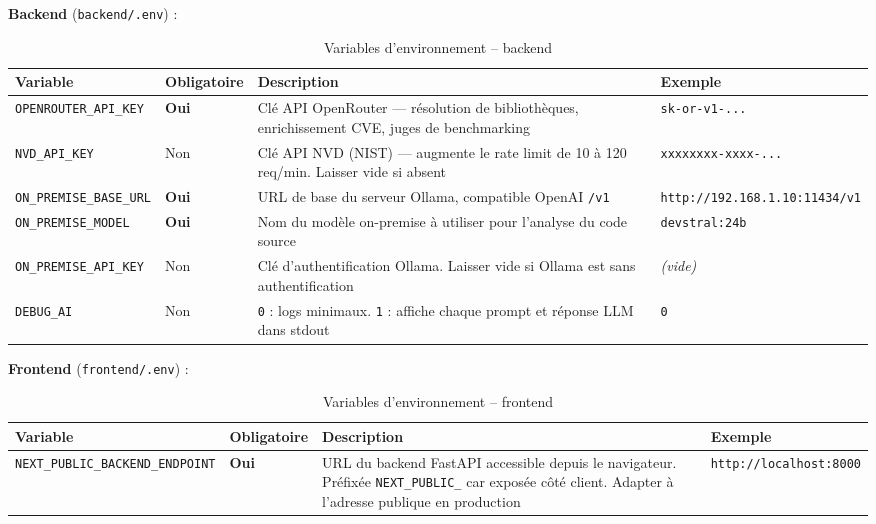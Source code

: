 \documentclass[a4paper, 12pt, hidelinks]{article}
\begin{document}
\textbf{Backend} (\texttt{backend/.env}) :

\begin{table}[H]
  \centering
  \begin{tabularx}{\textwidth}{l l X l}
    \toprule
    \textbf{Variable} & \textbf{Obligatoire} & \textbf{Description} & \textbf{Exemple} \\
    \midrule
    \texttt{OPENROUTER\_API\_KEY} & \textbf{Oui} & Clé API OpenRouter — résolution de bibliothèques, enrichissement CVE, juges de benchmarking & \texttt{sk-or-v1-...} \\
    \addlinespace
    \texttt{NVD\_API\_KEY} & Non & Clé API NVD (NIST) — augmente le rate limit de 10 à 120 req/min. Laisser vide si absent & \texttt{xxxxxxxx-xxxx-...} \\
    \addlinespace
    \texttt{ON\_PREMISE\_BASE\_URL} & \textbf{Oui} & URL de base du serveur Ollama, compatible OpenAI \texttt{/v1} & \texttt{http://192.168.1.10:11434/v1} \\
    \addlinespace
    \texttt{ON\_PREMISE\_MODEL} & \textbf{Oui} & Nom du modèle on-premise à utiliser pour l'analyse du code source & \texttt{devstral:24b} \\
    \addlinespace
    \texttt{ON\_PREMISE\_API\_KEY} & Non & Clé d'authentification Ollama. Laisser vide si Ollama est sans authentification & \textit{(vide)} \\
    \addlinespace
    \texttt{DEBUG\_AI} & Non & \texttt{0} : logs minimaux. \texttt{1} : affiche chaque prompt et réponse LLM dans stdout & \texttt{0} \\
    \bottomrule
  \end{tabularx}
  \caption{Variables d'environnement -- backend}
\end{table}

\textbf{Frontend} (\texttt{frontend/.env}) :

\begin{table}[H]
  \centering
  \begin{tabularx}{\textwidth}{l l X l}
    \toprule
    \textbf{Variable} & \textbf{Obligatoire} & \textbf{Description} & \textbf{Exemple} \\
    \midrule
    \texttt{NEXT\_PUBLIC\_BACKEND\_ENDPOINT} & \textbf{Oui} & URL du backend FastAPI accessible depuis le navigateur. Préfixée \texttt{NEXT\_PUBLIC\_} car exposée côté client. Adapter à l'adresse publique en production & \texttt{http://localhost:8000} \\
    \bottomrule
  \end{tabularx}
  \caption{Variables d'environnement -- frontend}
\end{table}
\end{document}
